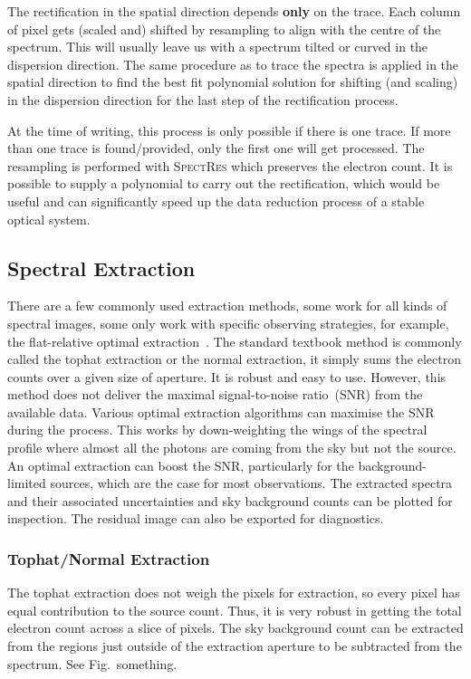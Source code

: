 \documentclass[fleqn,usenatbib]{mnras}
\begin{document}
The rectification in the spatial direction depends \textbf{only}
on the trace. Each column of pixel gets (scaled and) shifted by
resampling to align with the centre of the spectrum. This will
usually leave us with a spectrum tilted or curved in the dispersion
direction. The same procedure as to trace the spectra is applied
in the spatial direction to find the best fit polynomial solution
for shifting (and scaling) in the dispersion direction for the
last step of the rectification process.

At the time of writing, this process is only possible if there is
one trace. If more than one trace is found/provided, only the first
one will get processed. The resampling is performed with
\textsc{SpectRes} which preserves the electron count. It is possible
to supply a polynomial to carry out the rectification, which would
be useful and can significantly speed up the data reduction process
of a stable optical system.

\subsection{Spectral Extraction}
\label{sec:extract}
There are a few commonly used extraction methods, some work for
all kinds of spectral images, some only work with specific
observing strategies, for example, the flat-relative optimal
extraction~\citep{2014A&A...561A..59Z}. The standard textbook
method is commonly called the tophat extraction or the normal
extraction, it simply sums the electron counts over a given
size of aperture. It is robust and easy to use. However, this
method does not deliver the maximal signal-to-noise ratio~(SNR)
from the available data. Various optimal extraction algorithms
can maximise the SNR during the process. This works by
down-weighting the wings of the spectral profile where almost
all the photons are coming from the sky but not the source. An
optimal extraction can boost the SNR, particularly for the
background-limited sources, which are the case for most
observations. The extracted spectra and their associated
uncertainties and sky background counts can be plotted for
inspection. The residual image can also be exported for
diagnostics.

\subsubsection*{Tophat/Normal Extraction}
The tophat extraction does not weigh the pixels for extraction,
so every pixel has equal contribution to the source count. Thus,
it is very robust in getting the total electron count across
a slice of pixels. The sky background count can be extracted
from the regions just outside of the extraction aperture to be
subtracted from the spectrum. See Fig.~something.
\end{document}
